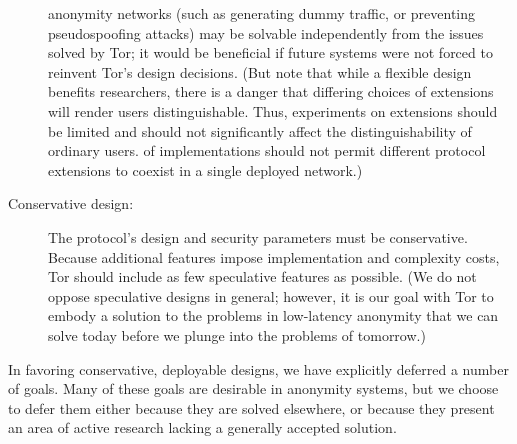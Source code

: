 \documentclass[times,10pt,twocolumn]{article}
\begin{document}
\begin{description}
  anonymity networks (such as generating dummy traffic, or preventing
  pseudospoofing attacks) may be solvable independently from the issues
  solved by Tor; it would be beneficial if future systems were not forced to
  reinvent Tor's design decisions.  (But note that while a flexible design
  benefits researchers, there is a danger that differing choices of
  extensions will render users distinguishable.  Thus, experiments
  on extensions should be limited and should not significantly affect
  the distinguishability of ordinary users.
  of implementations should
  not permit different protocol extensions to coexist in a single deployed
  network.)
\item[Conservative design:] The protocol's design and security parameters
  must be conservative.  Because additional features impose implementation
  and complexity costs, Tor should include as few speculative features as
  possible.  (We do not oppose speculative designs in general; however, it is
  our goal with Tor to embody a solution to the problems in low-latency
  anonymity that we can solve today before we plunge into the problems of
  tomorrow.)
\end{description}

In favoring conservative, deployable designs, we have explicitly deferred
a number of goals. Many of these goals are desirable in anonymity systems,
but we choose to defer them either because they are solved elsewhere,
or because they present an area of active research lacking a generally
accepted solution.
\end{document}
